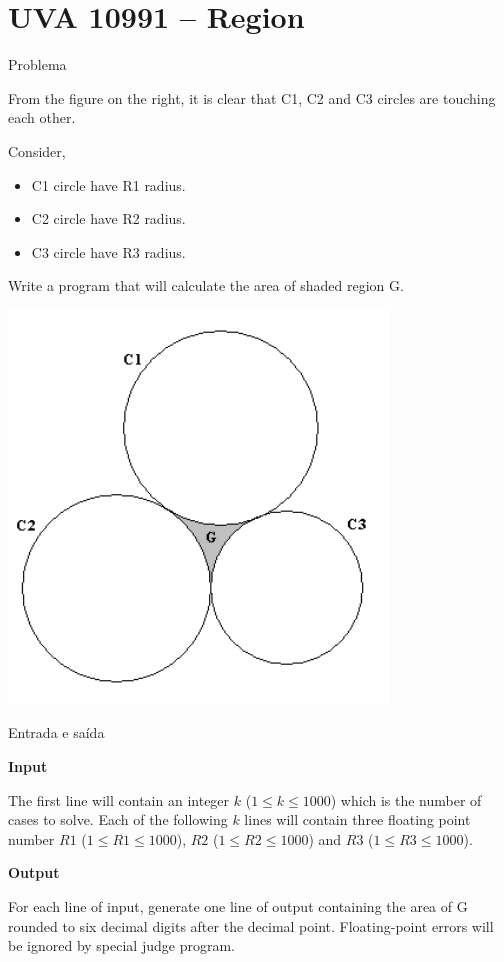 \section{UVA 10991 -- Region}

\begin{frame}[fragile]{Problema}

\begin{minipage}{0.55\textwidth}
From the figure on the right, it is clear that C1,
C2 and C3 circles are touching each other.

Consider,
\begin{itemize}
\item C1 circle have R1 radius.
\item C2 circle have R2 radius.
\item C3 circle have R3 radius.
\end{itemize}

Write a program that will calculate the area
of shaded region G.
\end{minipage}
\begin{minipage}{0.4\textwidth}
\begin{center}
\includegraphics[scale=0.5]{figure.png}
\end{center}
\end{minipage}

\end{frame}

\begin{frame}[fragile]{Entrada e saída}

\textbf{Input}

The first line will contain an integer $k$ ($1 \leq k \leq 1000$) which is the number of cases to 
solve.  Each of the following $k$ lines will contain three floating point number 
$R1$ ($1 \leq R1 \leq 1000$), $R2$ ($1 \leq R2 \leq 1000$) and $R3$ ($1 \leq R3 \leq 1000$).

\textbf{Output}

For each line of input, generate one line of output containing the area of G rounded to six
decimal digits after the decimal point. Floating-point errors will be ignored by special judge program.

\end{frame}

